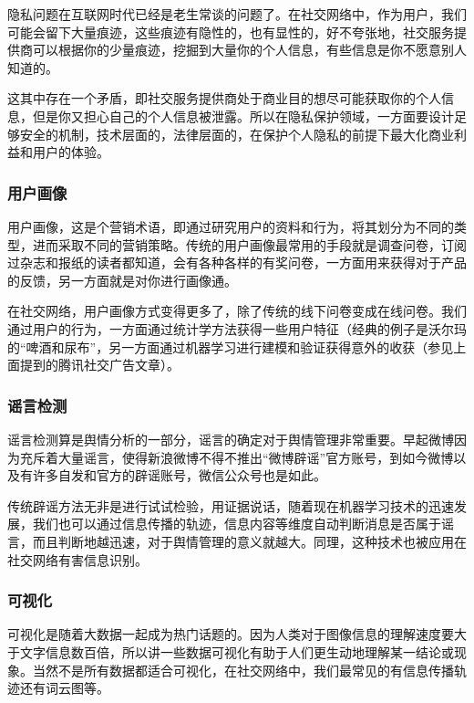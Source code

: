 \documentclass[12pt]{report}
\begin{document}
				隐私问题在互联网时代已经是老生常谈的问题了。在社交网络中，作为用户，我们可能会留下大量痕迹，这些痕迹有隐性的，也有显性的，好不夸张地，社交服务提供商可以根据你的少量痕迹，挖掘到大量你的个人信息，有些信息是你不愿意别人知道的。
				
				这其中存在一个矛盾，即社交服务提供商处于商业目的想尽可能获取你的个人信息，但是你又担心自己的个人信息被泄露。所以在隐私保护领域，一方面要设计足够安全的机制，技术层面的，法律层面的，在保护个人隐私的前提下最大化商业利益和用户的体验。
			
			\subsubsection{用户画像}
			
				用户画像，这是个营销术语，即通过研究用户的资料和行为，将其划分为不同的类型，进而采取不同的营销策略。传统的用户画像最常用的手段就是调查问卷，订阅过杂志和报纸的读者都知道，会有各种各样的有奖问卷，一方面用来获得对于产品的反馈，另一方面就是对你进行画像通。
				
				在社交网络，用户画像方式变得更多了，除了传统的线下问卷变成在线问卷。我们通过用户的行为，一方面通过统计学方法获得一些用户特征（经典的例子是沃尔玛的“啤酒和尿布”，另一方面通过机器学习进行建模和验证获得意外的收获（参见上面提到的腾讯社交广告文章）。
				
			\subsubsection{谣言检测}
			
				谣言检测算是舆情分析的一部分，谣言的确定对于舆情管理非常重要。早起微博因为充斥着大量谣言，使得新浪微博不得不推出“微博辟谣”官方账号，到如今微博以及有许多自发和官方的辟谣账号，微信公众号也是如此。
				
				传统辟谣方法无非是进行试试检验，用证据说话，随着现在机器学习技术的迅速发展，我们也可以通过信息传播的轨迹，信息内容等维度自动判断消息是否属于谣言，而且判断地越迅速，对于舆情管理的意义就越大。同理，这种技术也被应用在社交网络有害信息识别。
			
			\subsubsection{可视化}
			
				可视化是随着大数据一起成为热门话题的。因为人类对于图像信息的理解速度要大于文字信息数百倍，所以讲一些数据可视化有助于人们更生动地理解某一结论或现象。当然不是所有数据都适合可视化，在社交网络中，我们最常见的有信息传播轨迹还有词云图等。
				
\end{document}
